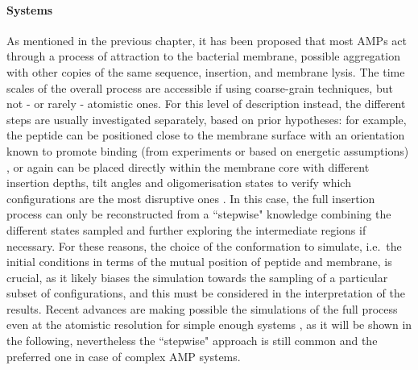 \paragraph{Systems} As mentioned in the previous chapter, it has been proposed that most AMPs act through a process of attraction to the bacterial membrane, possible aggregation with other copies of the same sequence, insertion, and membrane lysis. The time scales of the overall process are accessible if using coarse-grain techniques, but not - or rarely - atomistic ones.
%
For this level of description instead, the different steps are usually investigated separately, based on prior hypotheses: for example, the peptide can be positioned close to the membrane surface with an orientation known to promote binding (from experiments or based on energetic assumptions) \citep{Wang2012}, or again can be placed directly within the membrane core with different insertion depths, tilt angles and oligomerisation states to verify which configurations are the most disruptive ones \citep{Lipkin2017}. In this case, the full insertion process can only be reconstructed from a ``stepwise" knowledge combining the different states sampled and further exploring the intermediate regions if necessary.
%
For these reasons, the choice of the conformation to simulate, i.e.\ the initial conditions in terms of the mutual position of peptide and membrane, is crucial, as it likely biases the simulation towards the sampling of a particular subset of configurations, and this must be considered in the interpretation of the results. Recent advances are making possible the simulations of the full process even at the atomistic resolution for simple enough systems \citep{Ulmschneider2017,Sun2015}, as it will be shown in the following, nevertheless the ``stepwise" approach is still common and the preferred one in case of complex AMP systems.

